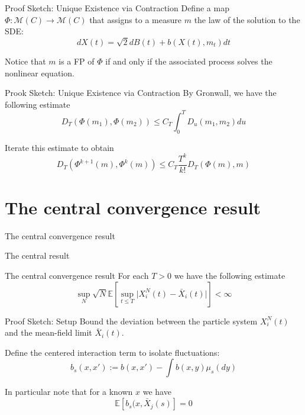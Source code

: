 \documentclass{beamer}
\newcommand{\sectionstart}[1]{
    \section{#1}
    \begin{frame}
        \centering
        \huge{#1}
    \end{frame}
}
\newcommand{\E}{\mathbb{E}}
\begin{document}
    \begin{frame}{Proof Sketch: Unique Existence via Contraction}
        Define a map $\Phi: \mathcal{M}(C) \to \mathcal{M}(C)$ that assigns to a measure $m$ the law of the solution to the SDE:
        \begin{equation*}
            dX(t) = \sqrt 2dB(t) + b(X(t), m_t)dt
        \end{equation*}

        \pause

        Notice that $m$ is a FP of $\Phi$ if and only if the associated process solves
        the nonlinear equation.
    \end{frame}
    \begin{frame}{Prook Sketch: Unique Existence via Contraction}
        By Gronwall, we have the following estimate
        \begin{equation*}
            D_T(\Phi(m_1), \Phi(m_2)) \leq C_T \int_0^T D_u(m_1, m_2) du
        \end{equation*}
        \pause

        Iterate this estimate to obtain
        \begin{equation*}
            D_T(\Phi^{k+1}(m),\Phi^k(m)) \leq C_T \frac{T^k}{k!}D_T(\Phi(m),m)
        \end{equation*}
    \end{frame}

    \sectionstart{The central convergence result}

    \begin{frame}{The central result}
        \begin{block}{The central convergence result}
            For each $T>0$ we have the following estimate
            \begin{equation*}
                \sup_N\sqrt N\E\left[\sup_{t\leq T}\vert X_i^N(t)-\bar X_i(t)\vert\right] < 
                \infty
            \end{equation*}
        \end{block}
    \end{frame}
    
    \begin{frame}{Proof Sketch: Setup}
        Bound the deviation between the particle system $X_i^N(t)$
        and the mean-field limit $\bar{X}_i(t)$.

        \pause
        \medskip
        
        Define the centered interaction term to isolate fluctuations:
        \begin{equation*}
            b_s(x, x') := b(x, x') - \int b(x, y) \mu_s(dy)
        \end{equation*}

        \pause

        In particular note that for a known $x$ we have
        \begin{equation*}
            \E[b_s(x,\bar X_j(s)] = 0
        \end{equation*}
    \end{frame}
    
\end{document}

